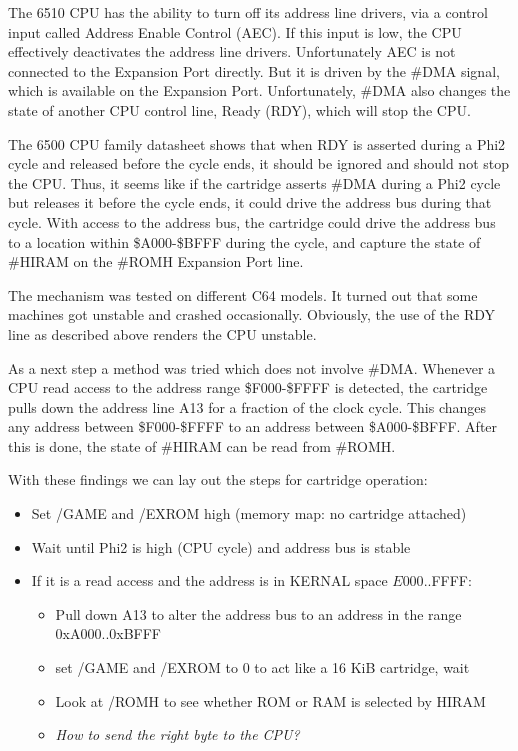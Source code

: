 \documentclass[a4paper]{memoir}
\begin{document}
The 6510 CPU has the ability to turn off its address line
drivers, via a control input called Address Enable Control (AEC). If
this input is low, the CPU effectively deactivates the address line
drivers. Unfortunately AEC is not connected to the Expansion
Port directly. But it is driven by the \#DMA signal, which is
available on the Expansion Port. Unfortunately, \#DMA also changes
the state of another CPU control line, Ready (RDY), which will stop
the CPU.

The 6500 CPU family datasheet shows that when RDY is asserted during a Phi2 cycle and released before the cycle ends, 
it should be ignored and should not stop the CPU. 
Thus, it seems like if the cartridge asserts \#DMA during a Phi2 cycle but releases it before the cycle ends, 
it could drive the address bus during that cycle.
With access to the address bus, the cartridge could drive the address bus to a location within \$A000-\$BFFF
during the cycle, and capture the state of \#HIRAM on the \#ROMH Expansion Port line.

The mechanism was tested on different C64 models. 
It turned out that some machines got unstable and crashed occasionally.
Obviously, the use of the RDY line as described above renders the CPU unstable.

As a next step a method was tried which does not involve \#DMA.
Whenever a CPU read access to the address range \$F000-\$FFFF is detected, 
the cartridge pulls down the address line A13 for a fraction of the clock cycle.
This changes any address between \$F000-\$FFFF to an address between \$A000-\$BFFF.
After this is done, the state of \#HIRAM can be read from \#ROMH.

With these findings we can lay out the steps for cartridge operation:

\begin{itemize}
\item Set /GAME and /EXROM high (memory map: no cartridge attached)
\item Wait until Phi2 is high (CPU cycle) and address bus is stable
\item If it is a read access and the address is in KERNAL space $E000..$FFFF:
    \begin{itemize}
    \item Pull down A13 to alter the address bus to an address in the range 0xA000..0xBFFF
    \item set /GAME and /EXROM to 0 to act like a 16 KiB cartridge, wait
    \item Look at /ROMH to see whether ROM or RAM is selected by HIRAM
    \item \textit{How to send the right byte to the CPU?}
    \end{itemize}
\end{itemize}
\end{document}
